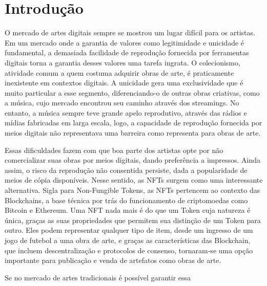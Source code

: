 \chapter{Introdução}
\label{cap:introducao}


O mercado de artes digitais sempre se mostrou um lugar difícil para os artistas. Em um mercado onde a garantia de valores como legitimidade e unicidade é fundamental, a demasiada facilidade de reprodução fornecida por ferramentas digitais torna a garantia desses valores uma tarefa ingrata. O colecionismo, atividade comum a quem costuma adquirir obras de arte, é praticamente inexistente em contextos digitais. A unicidade gera uma exclusividade que é muito particular a esse segmento, diferenciando-o de outras obras criativas, como a música, cujo mercado encontrou seu caminho através dos streamings. No entanto, a música sempre teve grande apelo reprodutivo, através das rádios e mídias fabricadas em larga escala, logo, a capacidade de reprodução fornecida por meios digitais não representava uma barreira como representa para obras de arte. 

Essas dificuldades fazem com que boa parte dos artistas opte por não comercializar suas obras por meios digitais, dando preferência a impressos. Ainda assim, o risco da reprodução não consentida persiste, dada a popularidade de meios de cópia disponíveis. Nesse sentido, as NFTs surgem como uma interessante alternativa. Sigla para Non-Fungible Tokens, as NFTs pertencem ao contexto das Blockchains, a base técnica por trás do funcionamento de criptomoedas como Bitcoin e Ethereum. Uma NFT nada mais é do que um Token cuja natureza é única, graças as suas propriedades que permitem sua distinção de um Token para outro. Eles podem representar qualquer tipo de item, desde um ingresso de um jogo de futebol a uma obra de arte, e graças as características das Blockchain, que incluem descentralização e protocolos de consenso, tornaram-se uma opção importante para publicação e venda de artefatos como obras de arte. 






Se no mercado de artes tradicionais é possível garantir essa 






